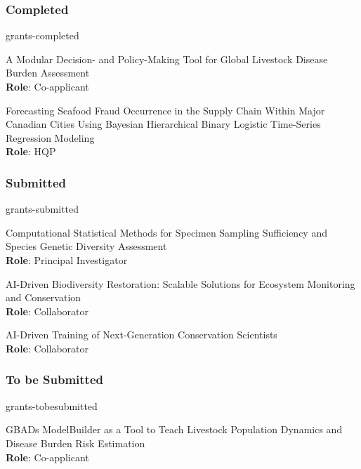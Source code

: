 \subsubsection{Completed}
\begin{revlist}{grants-completed}
\item {}
  A Modular Decision- and Policy-Making Tool for Global Livestock Disease Burden Assessment\\
  \textbf{Role}: Co-applicant
\item {}
  Forecasting Seafood Fraud Occurrence in the Supply Chain Within Major Canadian
  Cities Using Bayesian Hierarchical Binary Logistic Time-Series Regression Modeling\\
  \textbf{Role}: HQP
\end{revlist}

\subsubsection{Submitted}
\begin{revlist}{grants-submitted}
\item {}
  Computational Statistical Methods for Specimen Sampling Sufficiency and
  Species Genetic Diversity Assessment\\
  \textbf{Role}: Principal Investigator
\item {}
  AI-Driven Biodiversity Restoration: Scalable Solutions for Ecosystem
  Monitoring and Conservation\\
  \textbf{Role}: Collaborator
\item {}
  AI-Driven Training of Next-Generation Conservation Scientists\\
  \textbf{Role}: Collaborator
\end{revlist}

\subsubsection{To be Submitted}
\begin{revlist}{grants-tobesubmitted}
\item {}
  GBADs ModelBuilder as a Tool to Teach Livestock Population Dynamics and
  Disease Burden Risk Estimation\\
  \textbf{Role}: Co-applicant
\end{revlist}

